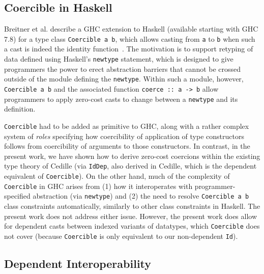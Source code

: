 \documentclass[acmsmall]{acmart}\settopmatter{}
\newcommand{\labsec}[1]{\label{sec:#1}}
\begin{document}


\subsection{Coercible in Haskell}
\labsec{others:hask}

Breitner et al. describe a GHC extension to Haskell (available
starting with GHC 7.8) for a type class \verb|Coercible a b|, which
allows casting from \verb|a| to \verb|b| when such a cast is indeed
the identity function~\cite{breitner+16}.  The motivation is to support retyping of data
defined using Haskell's \verb|newtype| statement, which is designed to
give programmers the power to erect abstraction barriers that cannot
be crossed outside of the module defining the \verb|newtype|.  Within
such a module, however, \verb|Coercible a b| and the associated
function \verb|coerce :: a -> b| allow programmers to apply zero-cost
casts to change between a \verb|newtype| and its definition.

\verb|Coercible| had to be added as primitive to GHC, along with a
rather complex system of \emph{roles} specifying how coercibility of
application of type constructors follows from coercibility of
arguments to those constructors.  In contrast, in the present work, we
have shown how to derive zero-cost coercions
within the existing type
theory of Cedille (via \verb;IdDep;, also derived in Cedille, which
is the dependent equivalent of \verb|Coercible|).
On the other hand, much of the
complexity of \verb|Coercible| in GHC arises from (1) how it
interoperates with programmer-specified abstraction (via
\verb|newtype|) and (2) the need to resolve \verb|Coercible a b| class
constraints automatically, similarly to other class constraints in
Haskell.  The present work does not address either issue.
However, the present work does allow for dependent casts between
indexed variants of datatypes, which \verb|Coercible| does not cover
(because \verb|Coercible| is only equivalent to our non-dependent
\verb;Id;).

\subsection{Dependent Interoperability}
\end{document}
